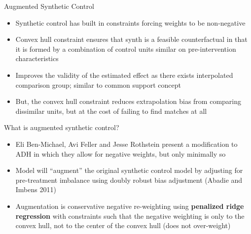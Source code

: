 \documentclass{beamer}
\begin{document}
\begin{frame}{Augmented Synthetic Control}
\begin{itemize}
\item Synthetic control has built in constraints forcing weights to be non-negative
\item Convex hull constraint ensures that synth is a feasible counterfactual in that it is formed by a combination of control units similar on pre-intervention characteristics
\item Improves the validity of the estimated effect as there exists interpolated comparison group; similar to common support concept
\item But, the convex hull constraint reduces extrapolation bias from comparing dissimilar units, but at the cost of failing to find matches at all
\end{itemize}

\end{frame}



\begin{frame}{What is augmented synthetic control?}

\begin{itemize}
\item Eli Ben-Michael, Avi Feller and Jesse Rothstein present a modification to ADH in which they allow for negative weights, but only minimally so
\item Model will ``augment'' the original synthetic control model by adjusting for pre-treatment imbalance using doubly robust bias adjustment (Abadie and Imbens 2011)
\item Augmentation is conservative negative re-weighting using \textbf{penalized ridge regression} with constraints such that the negative weighting is only to the convex hull, not to the center of the convex hull (does not over-weight)
\end{itemize}

\end{frame}
\end{document}
